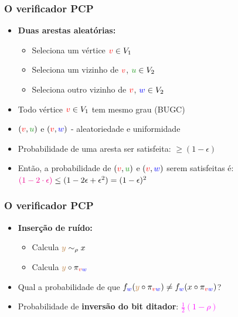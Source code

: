 \documentclass[11pt, handout]{beamer}
\newcommand{\red}[1]{\textcolor{red}{#1}}
\newcommand{\blue}[1]{\textcolor{blue}{#1}}
\newcommand{\green}[1]{\textcolor{pine}{#1}}
\newcommand{\brown}[1]{\textcolor{brown}{#1}}
\newcommand{\mage}[1]{\textcolor{magenta}{#1}}
\begin{document}
\begin{frame}[<+->]
\frametitle{O verificador PCP}
    \begin{itemize}
    \item \textbf{Duas arestas aleatórias:}
    \begin{itemize}
        \item Seleciona um vértice $\red{v}\in V_1$
        \item Seleciona um vizinho de $\red{v}$, $\green{u}\in V_2$
        \item Seleciona outro vizinho de $\red{v}$, $\blue{w}\in V_2$
    \end{itemize}
    \item Todo vértice $\red{v}\in V_1$ tem mesmo grau (BUGC)
    \item $(\red{v},\green{u})$ e $(\red{v},\blue{w})$ - aleatoriedade e uniformidade
    \item Probabilidade de uma aresta ser satisfeita: $\geq  (1-\epsilon)$
    \item Então, a probabilidade de $(\red{v},\green{u})$ e $(\red{v},\blue{w})$ serem satisfeitas é: \\ $\mage{(1-2\cdot\epsilon)} \leq (1-2\epsilon + \epsilon^2) = (1-\epsilon)^2$
    \end{itemize}
\end{frame}{}


\begin{frame}[<+->]
\frametitle{O verificador PCP}
    \begin{itemize}
    \item \textbf{Inserção de ruído:}
    \begin{itemize}
        \item Calcula $\brown{y}\sim_\rho x$
        \item Calcula $\brown{y}\circ \pi_{\red{v}\blue{w}}$
    \end{itemize}
    \item Qual a probabilidade de que $f_{\blue{w}}(\brown{y}\circ \pi_{\red{v}\blue{w}}) \ne f_{\blue{w}}(x\circ \pi_{\red{v}\blue{w}})$?
    \item Probabilidade de \textbf{inversão do bit ditador}: \mage{$\frac{1}{2}(1-\rho)$}
    \end{itemize}
\end{frame}{}
\end{document}
